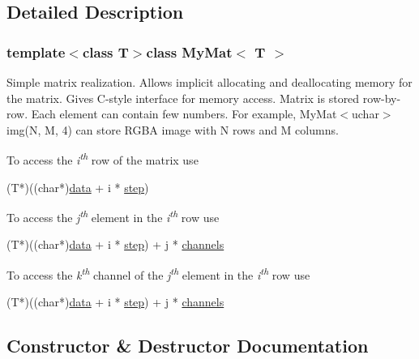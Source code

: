 \subsection{Detailed Description}
\subsubsection*{template$<$class T$>$class My\+Mat$<$ T $>$}

Simple matrix realization. Allows implicit allocating and deallocating memory for the matrix. Gives C-\/style interface for memory access. Matrix is stored row-\/by-\/row. Each element can contain few numbers. For example, My\+Mat$<$uchar$>$ img(\+N, M, 4) can store R\+G\+B\+A image with N rows and M columns. 
\begin{DoxyItemize}
\item To access the {\itshape i\textsuperscript{th}} row of the matrix use 
\begin{DoxyCode}
(T*)((\textcolor{keywordtype}{char}*)\hyperlink{class_my_mat_a29154d1b11ce91aaaa52eb83a35f50c0}{data} + i * \hyperlink{class_my_mat_a0bc5135809fda64e6cd0515e4930237b}{step}) 
\end{DoxyCode}
 
\item To access the {\itshape j\textsuperscript{th}} element in the {\itshape i\textsuperscript{th}} row use 
\begin{DoxyCode}
(T*)((\textcolor{keywordtype}{char}*)\hyperlink{class_my_mat_a29154d1b11ce91aaaa52eb83a35f50c0}{data} + i * \hyperlink{class_my_mat_a0bc5135809fda64e6cd0515e4930237b}{step}) + j * \hyperlink{class_my_mat_a25287cc2362682c8357dde5d4da24a2c}{channels} 
\end{DoxyCode}
 
\item To access the {\itshape k\textsuperscript{th}} channel of the {\itshape j\textsuperscript{th}} element in the {\itshape i\textsuperscript{th}} row use 
\begin{DoxyCode}
(T*)((\textcolor{keywordtype}{char}*)\hyperlink{class_my_mat_a29154d1b11ce91aaaa52eb83a35f50c0}{data} + i * \hyperlink{class_my_mat_a0bc5135809fda64e6cd0515e4930237b}{step}) + j * \hyperlink{class_my_mat_a25287cc2362682c8357dde5d4da24a2c}{channels} 
\end{DoxyCode}
 
\end{DoxyItemize}

\subsection{Constructor \& Destructor Documentation}
\hypertarget{class_my_mat_a9321ac5b90734babfe503a7872d9a896}{}
